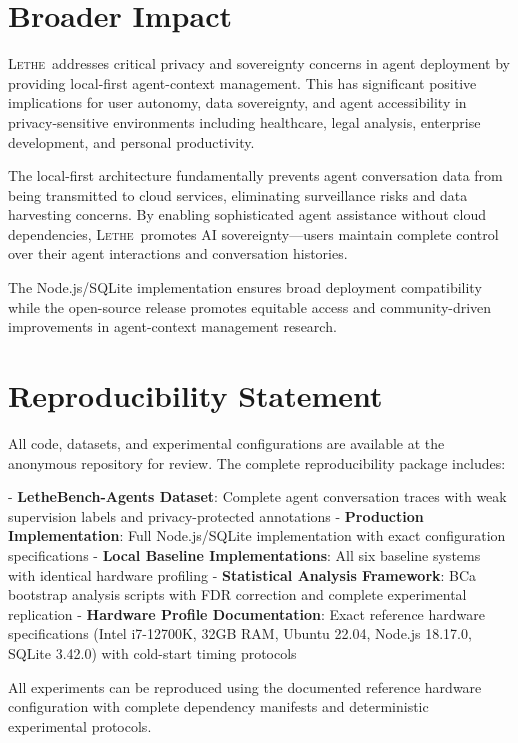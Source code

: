 \documentclass[letterpaper]{article}
\newcommand{\lethe}{\textsc{Lethe}}
\begin{document}
\section*{Broader Impact}

\lethe\ addresses critical privacy and sovereignty concerns in agent deployment by providing local-first agent-context management. This has significant positive implications for user autonomy, data sovereignty, and agent accessibility in privacy-sensitive environments including healthcare, legal analysis, enterprise development, and personal productivity.

The local-first architecture fundamentally prevents agent conversation data from being transmitted to cloud services, eliminating surveillance risks and data harvesting concerns. By enabling sophisticated agent assistance without cloud dependencies, \lethe\ promotes AI sovereignty—users maintain complete control over their agent interactions and conversation histories.

The Node.js/SQLite implementation ensures broad deployment compatibility while the open-source release promotes equitable access and community-driven improvements in agent-context management research.

\section*{Reproducibility Statement}

All code, datasets, and experimental configurations are available at the anonymous repository for review. The complete reproducibility package includes:

- \textbf{LetheBench-Agents Dataset}: Complete agent conversation traces with weak supervision labels and privacy-protected annotations
- \textbf{Production Implementation}: Full Node.js/SQLite implementation with exact configuration specifications
- \textbf{Local Baseline Implementations}: All six baseline systems with identical hardware profiling
- \textbf{Statistical Analysis Framework}: BCa bootstrap analysis scripts with FDR correction and complete experimental replication
- \textbf{Hardware Profile Documentation}: Exact reference hardware specifications (Intel i7-12700K, 32GB RAM, Ubuntu 22.04, Node.js 18.17.0, SQLite 3.42.0) with cold-start timing protocols

All experiments can be reproduced using the documented reference hardware configuration with complete dependency manifests and deterministic experimental protocols.
\end{document}

